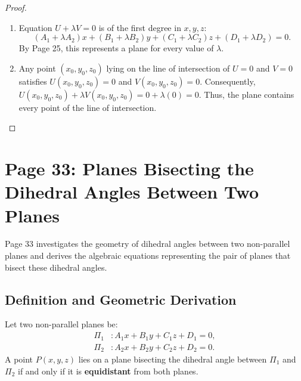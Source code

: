 \begin{proof}
\begin{enumerate}
    \item Equation $U + \lambda V = 0$ is of the first degree in $x, y, z$:
    \begin{equation}
        (A_1 + \lambda A_2)x + (B_1 + \lambda B_2)y + (C_1 + \lambda C_2)z + (D_1 + \lambda D_2) = 0.
    \end{equation}
    By Page 25, this represents a plane for every value of $\lambda$.
    \item Any point $(x_0, y_0, z_0)$ lying on the line of intersection of $U=0$ and $V=0$ satisfies $U(x_0, y_0, z_0) = 0$ and $V(x_0, y_0, z_0) = 0$.
    Consequently, $U(x_0, y_0, z_0) + \lambda V(x_0, y_0, z_0) = 0 + \lambda(0) = 0$.
    Thus, the plane contains every point of the line of intersection.
\end{enumerate}
\end{proof}

\section{Page 33: Planes Bisecting the Dihedral Angles Between Two Planes}
\label{sec:page33}

\begin{conceptbox}
Page 33 investigates the geometry of dihedral angles between two non-parallel planes and derives the algebraic equations representing the pair of planes that bisect these dihedral angles.
\end{conceptbox}

\subsection{Definition and Geometric Derivation}
Let two non-parallel planes be:
\begin{align}
    \Pi_1 &: A_1 x + B_1 y + C_1 z + D_1 = 0, \\
    \Pi_2 &: A_2 x + B_2 y + C_2 z + D_2 = 0.
\end{align}
A point $P(x, y, z)$ lies on a plane bisecting the dihedral angle between $\Pi_1$ and $\Pi_2$ if and only if it is \textbf{equidistant} from both planes.

